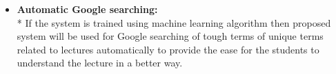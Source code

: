 \begin{itemize}
\item \textbf{Automatic Google searching:}\\*
If the system is trained using machine learning algorithm then proposed system will be used for Google searching of tough terms of unique terms related to lectures automatically to provide the ease for the students to understand the lecture in a better way.

\end{itemize}



